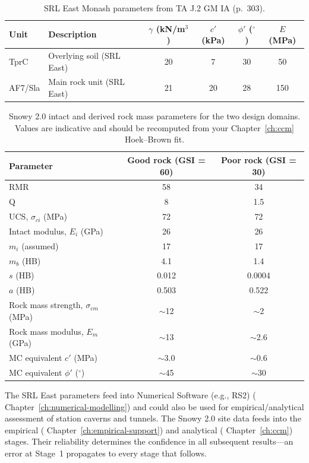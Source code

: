 \begin{table}[h!]
\centering
\small
\begin{tabular}{l l c c c c}
\toprule
\textbf{Unit} & \textbf{Description} & $\gamma$ (kN/m$^3$) & $c'$ (kPa) & $\phi'$ ($^\circ$) & $E$ (MPa) \\
\midrule
TprC & Overlying soil (SRL East) & 20 & 7 & 30 & 50 \\
AF7/Sla & Main rock unit (SRL East) & 21 & 20 & 28 & 150 \\
\bottomrule
\end{tabular}
\caption{SRL East Monash parameters from TA J.2 GM IA (p.~303).}
\label{tab:srl_params}
\end{table}

\begin{table}[h!]
\centering
\small
\begin{tabular}{l c c}
\toprule
\textbf{Parameter} & \textbf{Good rock (GSI = 60)} & \textbf{Poor rock (GSI = 30)} \\
\midrule
RMR & 58 & 34 \\
Q & 8 & 1.5 \\
UCS, $\sigma_{ci}$ (MPa) & 72 & 72 \\
Intact modulus, $E_i$ (GPa) & 26 & 26 \\
$m_i$ (assumed) & 17 & 17 \\
$m_b$ (HB) & 4.1 & 1.4 \\
$s$ (HB) & 0.012 & 0.0004 \\
$a$ (HB) & 0.503 & 0.522 \\
Rock mass strength, $\sigma_{cm}$ (MPa) & $\sim$12 & $\sim$2 \\
Rock mass modulus, $E_m$ (GPa) & $\sim$13 & $\sim$2.6 \\
MC equivalent $c'$ (MPa) & $\sim$3.0 & $\sim$0.6 \\
MC equivalent $\phi'$ ($^\circ$) & $\sim$45 & $\sim$30 \\
\bottomrule
\end{tabular}
\caption{Snowy 2.0 intact and derived rock mass parameters for the two design domains. Values are indicative and should be recomputed from your Chapter~\ref{ch:ccm} Hoek--Brown fit.}
\label{tab:snowy_params}
\end{table}

\begin{notebox}
The SRL East parameters feed into Numerical Software (e.g., RS2) ( Chapter~\ref{ch:numerical-modelling}) and could also be used for empirical/analytical assessment of station caverns and tunnels. The Snowy 2.0 site data feeds into the empirical ( Chapter~\ref{ch:empirical-support}) and analytical ( Chapter~\ref{ch:ccm}) stages. Their reliability determines the confidence in all subsequent results---an error at Stage~1 propagates to every stage that follows.
\end{notebox}

